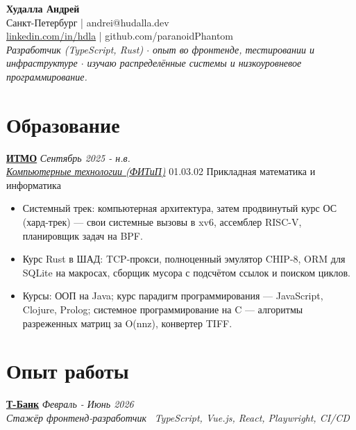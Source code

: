 \documentclass[11pt,a4paper]{article}
\begin{document}
\begin{center}
	{\Huge \textbf{Худалла Андрей}}\\[0.3em]
	Санкт-Петербург | andrei@hudalla.dev \\
	\href{https://www.linkedin.com/in/hdla/}{linkedin.com/in/hdla} | github.com/paranoidPhantom\\[0.5em]
{\itshape Разработчик (TypeScript, Rust) $\cdot$ опыт во фронтенде, тестировании и инфраструктуре $\cdot$ изучаю распределённые системы и низкоуровневое программирование.}
\end{center}

\section*{Образование}
\noindent\href{https://itmo.ru}{\textbf{ИТМО}} \hfill \textit{Сентябрь 2025 - н.в.} \\
\href{https://abit.itmo.ru/program/bachelor/programming}{\textit{Компьютерные технологии (ФИТиП)}} \hfill 01.03.02 Прикладная математика и информатика

\begin{itemize}[leftmargin=*,itemsep=1pt,topsep=2pt,parsep=0pt]
	\item Системный трек: компьютерная архитектура, затем продвинутый курс ОС (хард-трек) — свои системные вызовы в xv6, ассемблер RISC-V, планировщик задач на BPF.
	\item Курс Rust в ШАД: TCP-прокси, полноценный эмулятор CHIP-8, ORM для SQLite на макросах, сборщик мусора с подсчётом ссылок и поиском циклов.
	\item Курсы: ООП на Java; курс парадигм программирования — JavaScript, Clojure, Prolog; системное программирование на C — алгоритмы разреженных матриц за O(nnz), конвертер TIFF.
\end{itemize}

\section*{Опыт работы}

\noindent\href{https://tbank.ru}{\textbf{Т-Банк}} \hfill \textit{Февраль - Июнь 2026} \\
\textit{Стажёр фронтенд-разработчик} \textbullet\ \textit{TypeScript, Vue.js, React, Playwright, CI/CD}
\end{document}
